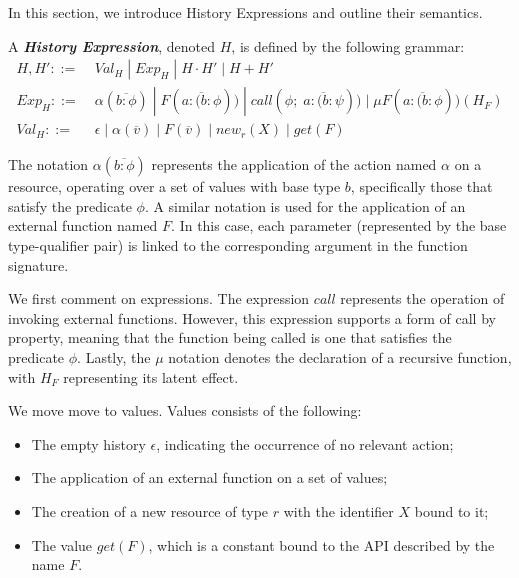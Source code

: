 In this section, we introduce History Expressions and outline their semantics.

\begin{definition}
    A \textbf{\emph{History Expression}}, denoted $H$, is defined by the following grammar:
    \begin{equation}
        \begin{split}
            H, H' ::=& \;Val_H \;|\; Exp_H \;|\; H \cdot H' \;|\; H + H' \\
            Exp_{H} ::=& \;\alpha(\overline{b{:}\phi}) \;|\; F(\overline{a{:}(b{:}\phi})) \;|\; call(\phi; \;\overline{a{:}(b{:}\psi})) \;|\; \mu F(\overline{a{:}(b{:}\phi}))(H_F) \\
            Val_{H} ::=& \;\epsilon \;|\; \alpha(\overline{v}) \;|\; F(\overline{v}) \;|\; new_r(X) \;|\; get(F)
        \end{split}
        \label{eq:hist_gramm}
    \end{equation}
\end{definition}

The notation $\alpha(\overline{b{:}\phi})$ represents the application of the action named $\alpha$ on a resource, operating over a set of values with base type $b$, specifically those that satisfy the predicate $\phi$. A similar notation is used for the application of an external function named $F$. In this case, each parameter (represented by the base type-qualifier pair) is linked to the corresponding argument in the function signature.

We first comment on expressions. The expression $call$ represents the operation of invoking external functions. However, this expression supports a form of call by property, meaning that the function being called is one that satisfies the predicate $\phi$. Lastly, the $\mu$ notation denotes the declaration of a recursive function, with $H_F$ representing its latent effect.

We move move to values. Values consists of the following:
    \begin{itemize}
    \item The empty history $\epsilon$, indicating the occurrence of no relevant action;
    \item The application of an external function on a set of values; 
    \item The creation of a new resource of type $r$ with the identifier $X$ bound to it; 
    \item The value $get(F)$, which is a constant bound to the API described by the name $F$.
\end{itemize}

